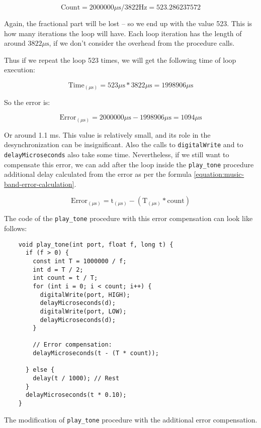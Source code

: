 \documentclass[../sparc.tex]{subfiles}
\begin{document}
\begin{equation}
  \mbox{Count} = 2000000 \mu\mbox{s} / 3822 \mbox{Hz} = 523.286237572
\end{equation}

Again, the fractional part will be lost -- so we end up with the value 523.  This
is how many iterations the loop will have.  Each loop iteration has the length
of around $3822 \mu\mbox{s}$, if we don't consider the overhead from the procedure
calls.

Thus if we repeat the loop 523 times, we will get the following time of loop
execution:

\begin{equation}
  \mbox{Time}_{(\mu\mbox{s})} = 523 \mu\mbox{s} * 3822 \mu\mbox{s} = 1998906 \mu\mbox{s}
\end{equation}

So the error is:

\begin{equation}
  \mbox{Error}_{(\mu\mbox{s})} = 2000000 \mu\mbox{s} - 1998906 \mu\mbox{s} = 1094 \mu\mbox{s}
\end{equation}

Or around 1.1 ms.  This value is relatively small, and its role in the
desynchronization can be insignificant.  Also the calls to \texttt{digitalWrite}
and to \texttt{delayMicroseconds} also take some time.  Nevertheless, if we
still want to compensate this error, we can add after the loop inside the
\texttt{play\_tone} procedure additional delay calculated from the error as per
the formula \ref{equation:music-band-error-calculation}.

\begin{equation}
  \mbox{Error}_{(\mu\mbox{s})} = \mbox{t}_{(\mu\mbox{s})} -
  (\mbox{T}_{(\mu\mbox{s})} * \mbox{count})
  \label{equation:music-band-error-calculation}
\end{equation}

The code of the \texttt{play\_tone} procedure with this error compensation can
look like follows:

\begin{listing}[!h]
  \begin{verbatim}
    void play_tone(int port, float f, long t) {
      if (f > 0) {
        const int T = 1000000 / f;
        int d = T / 2;
        int count = t / T;
        for (int i = 0; i < count; i++) {
          digitalWrite(port, HIGH);
          delayMicroseconds(d);
          digitalWrite(port, LOW);
          delayMicroseconds(d);
        }

        // Error compensation:
        delayMicroseconds(t - (T * count));

      } else {
        delay(t / 1000); // Rest
      }
      delayMicroseconds(t * 0.10);
    }
  \end{verbatim}
  \label{listing:music-band-play-tone-with-error-compensation}
  \caption{The modification of \texttt{play\_tone} procedure with the additional
    error compensation.}
\end{listing}
\end{document}
